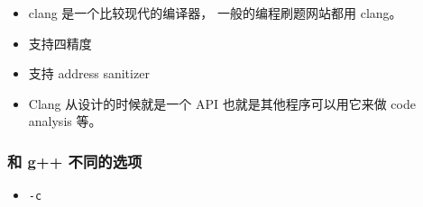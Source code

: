 
\begin{issues}
\issueDraft
\end{issues}

\begin{itemize}
\item clang 是一个比较现代的编译器， 一般的编程刷题网站都用 clang。
\item 支持四精度
\item 支持 address sanitizer
\item Clang 从设计的时候就是一个 API 也就是其他程序可以用它来做 code analysis 等。
\end{itemize}

\subsubsection{和 g++ 不同的选项}
\begin{itemize}
\item \verb|-c|
\end{itemize}
